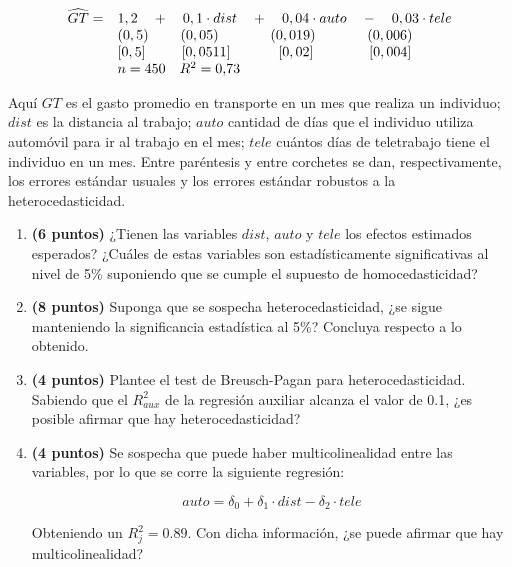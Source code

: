 \documentclass[10pt,a4paper]{article}
\begin{document}
\begin{enumerate}
{\scriptsize
\begin{equation*}
\begin{array}{ll}
\widehat{GT} = & 1,2 \quad + \quad0,1 \cdot dist\quad + \quad 0,04 \cdot auto \quad - \quad 0,03 \cdot tele
 \\
& (0,5)  \hspace{0,8cm} (0,05) \hspace{1,3cm} (0,019) \hspace{1,3cm} (0,006)\\ 
& [0,5]  \hspace{0,9cm} [0,0511] \hspace{1,2cm} [0,02] \hspace{1,4cm}  [0,004] \\
& n = \text{450} \quad R^2 = \text{0,73}
\end{array}
\end{equation*}}



Aquí $GT$ es el gasto promedio en transporte en un mes que realiza un individuo; $dist$ es la distancia al trabajo; $auto$ cantidad de días que el individuo utiliza automóvil para ir al trabajo en el mes; $tele$ cuántos días de teletrabajo tiene el individuo en un mes. Entre paréntesis y entre corchetes se dan, respectivamente,
los errores estándar usuales y los errores estándar robustos a la heterocedasticidad.


\begin{enumerate}
    \item \textbf{(6 puntos)} ¿Tienen las variables  $dist$, $auto$ y $tele$ los efectos estimados esperados? ¿Cuáles de estas variables son estadísticamente significativas al nivel de 5\% suponiendo que se cumple el supuesto de homocedasticidad?

\item \textbf{(8 puntos)} Suponga que se sospecha heterocedasticidad, ¿se sigue manteniendo la significancia estadística al 5\%? Concluya respecto a lo obtenido.

\item \textbf{(4 puntos)} Plantee el test de Breusch-Pagan para heterocedasticidad. Sabiendo que el $R_{aux}^2$ de la regresión auxiliar alcanza el valor de 0.1, ¿es posible afirmar que hay heterocedasticidad?

\item \textbf{(4 puntos)} Se sospecha que puede haber multicolinealidad entre las variables, por lo que se corre la siguiente regresión:

$$auto = \delta_0 + \delta_1 \cdot dist - \delta_2 \cdot tele$$

Obteniendo un $R_j^2 = 0.89$. Con dicha información, ¿se puede afirmar que hay multicolinealidad?

\end{enumerate}
\end{enumerate}
\end{document}
